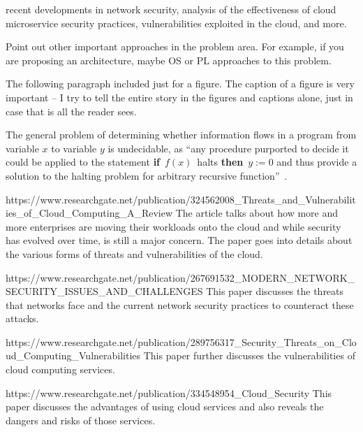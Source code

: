 recent developments in network security, analysis of the effectiveness of cloud
microservice security practices, vulnerabilities exploited in the cloud, and more.

Point out other important approaches in the problem area. For example, if you 
are proposing an architecture, maybe OS or PL approaches to this problem. 

The following paragraph included just for a figure. The caption of a figure is very
important -- I try to tell the entire story in the figures and captions alone, 
just in case that is all the reader sees.

The general problem of determining whether information flows in a program from
variable $x$ to variable $y$ is undecidable, as ``any procedure purported to
decide it could be applied to the statement {\bf if}~$f(x)$~halts {\bf then}~$y
:= 0$ and thus provide a solution to the halting problem for arbitrary
recursive function''~\cite{denning-impossible}.  

https://www.researchgate.net/publication/324562008_Threats_and_Vulnerabilities_of_Cloud_Computing_A_Review
The article talks about how more and more enterprises are moving their workloads onto the cloud and while
security has evolved over time, is still a major concern. The paper goes into details about the various forms
of threats and vulnerabilities of the cloud.

https://www.researchgate.net/publication/267691532_MODERN_NETWORK_SECURITY_ISSUES_AND_CHALLENGES
This paper discusses the threats that networks face and the current network security practices to counteract these attacks.

https://www.researchgate.net/publication/289756317_Security_Threats_on_Cloud_Computing_Vulnerabilities
This paper further discusses the vulnerabilities of cloud computing services.

https://www.researchgate.net/publication/334548954_Cloud_Security
This paper discusses the advantages of using cloud services and also reveals the dangers and risks of those services.